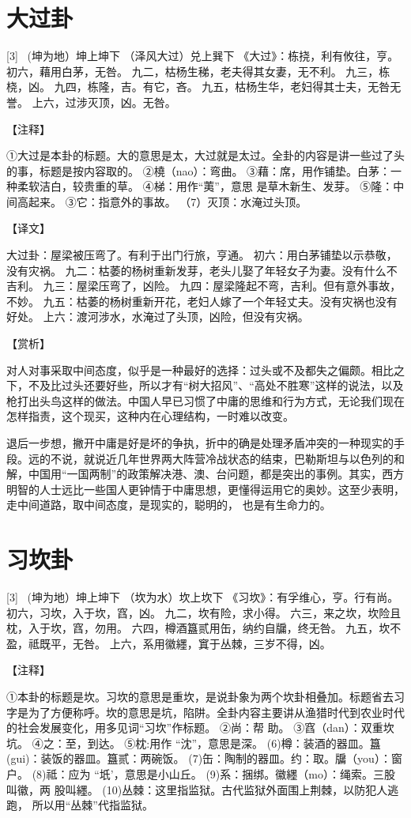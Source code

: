 \documentclass[12pt,UTF8]{ctexbook}
\begin{document}
\chapter{大过卦}
[3] \ (坤为地）坤上坤下
（泽风大过）兑上巽下
《大过》：栋挠，利有攸往，亨。
初六，藉用白茅，无咎。
九二，枯杨生稊，老夫得其女妻，无不利。
九三，栋桡，凶。
九四，栋隆，吉。有它，吝。
九五，枯杨生华，老妇得其士夫，无咎无誉。
上六，过涉灭顶，凶。无咎。

【注释】

①大过是本卦的标题。大的意思是太，大过就是太过。全卦的内容是讲一些过了头的事，标题是按内容取的。
②橈（nao）：弯曲。
③藉：席，用作铺垫。白茅：一种柔软洁白，较贵重的草。
④梯：用作“荑”，意思 是草木新生、发芽。
⑤隆：中间高起来。
③它：指意外的事故。
（7）灭顶：水淹过头顶。

【译文】

大过卦：屋梁被压弯了。有利于出门行旅，亨通。
初六：用白茅铺垫以示恭敬，没有灾祸。
九二：枯萎的杨树重新发芽，老头儿娶了年轻女子为妻。没有什么不吉利。
九三：屋梁压弯了，凶险。
九四：屋梁隆起不弯，吉利。但有意外事故，不妙。
九五：枯萎的杨树重新开花，老妇人嫁了一个年轻丈夫。没有灾祸也没有好处。
上六：渡河涉水，水淹过了头顶，凶险，但没有灾祸。

【赏析】

对人对事采取中间态度，似乎是一种最好的选择：过头或不及都失之偏颇。相比之下，不及比过头还要好些，所以才有“树大招风”、“高处不胜寒”这样的说法，以及枪打出头鸟这样的做法。中国人早已习惯了中庸的思维和行为方式，无论我们现在怎样指责，这个现买，这种内在心理结构，一时难以改变。

退后一步想，撇开中庸是好是坏的争执，折中的确是处理矛盾冲突的一种现实的手段。远的不说，就说近几年世界两大阵营冷战状态的结束，巴勒斯坦与以色列的和解，中国用“一国两制”的政策解决港、澳、台问题，都是突出的事例。其实，西方明智的人士远比一些国人更钟情于中庸思想，更懂得运用它的奥妙。这至少表明，走中间道路，取中间态度，是现实的，聪明的， 也是有生命力的。

\chapter{习坎卦}
[3] \ (坤为地）坤上坤下
（坎为水）坎上坎下
《习坎》：有孚维心，亨。行有尚。
初六，习坎，入于坎，窞，凶。
九二，坎有险，求小得。
六三，来之坎，坎险且枕，入于坎，窞，勿用。
六四，樽酒簋贰用缶，纳约自牖，终无咎。
九五，坎不盈，祗既平，无咎。
上六，系用徽纆，窴于丛棘，三岁不得，凶。

【注释】

①本卦的标题是坎。习坎的意思是重坎，是说卦象为两个坎卦相叠加。标题省去习字是为了方便称呼。坎的意思是坑，陷阱。全卦内容主要讲从渔猎时代到农业时代的社会发展变化，用多见词“习坎”作标题。
②尚：帮 助。
③窞（dan）：双重坎坑。
④之：至，到达。
⑤枕:用作 “沈”，意思是深。
(6)樽：装酒的器皿。簋(gui)：装饭的器皿。簋贰：两碗饭。
(7)缶：陶制的器皿。约：取。牖（you）：窗户。
(8)祗：应为 “坁’，意思是小山丘。
(9)系：捆绑。徽纆（mo）：绳索。三股叫徽，两 股叫纆。
(10)丛棘：这里指监狱。古代监狱外面围上荆棘，以防犯人逃跑， 所以用“丛棘”代指监狱。
\end{document}
